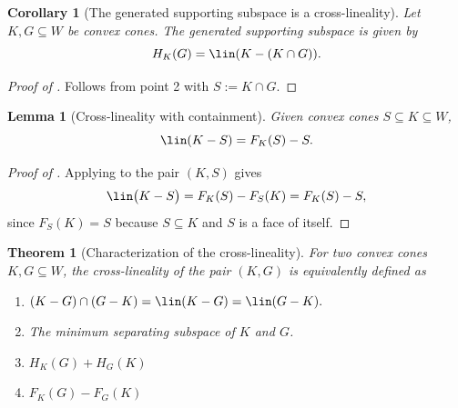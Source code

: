 \documentclass{article}
\theoremstyle{plain}
\newtheorem{theorem}{Theorem}[section]
\newtheorem{corollary}[corollary]{Corollary}
\newtheorem{lemma}[lemma]{Lemma}
\theoremstyle{definition}
\theoremstyle{remark}
\begin{document}
\begin{corollary}[The generated supporting subspace is a cross-lineality]
\label{loc:the_generated_supporting_subspace_is_a_cross:lineality.statement}
Let $K, G \subseteq W$ be convex cones. The generated supporting
subspace is given by 
\begin{equation*}
H_K(G)=  \lin(K- (K \cap G)).
\end{equation*}
\end{corollary}
\begin{proof}[\hypertarget{loc:the_generated_supporting_subspace_is_a_cross:lineality.proof}{}Proof of ]

Follows from  point 2 with $S := K \cap G$.
\end{proof}
\begin{lemma}[Cross-lineality with containment]
\label{loc:cross:lineality_with_containment.statement}
Given convex cones $S \subseteq K \subseteq W$,
\begin{equation*}
\lin(K - S) = F_K(S) - S.
\end{equation*}
\end{lemma}
\begin{proof}[\hypertarget{loc:cross:lineality_with_containment.proof}{}Proof of ]

Applying  to the pair $(K, S)$ gives
\begin{equation*}
\lin\bigl(K-S\bigr) = F_K(S) - F_{S}(K) = F_K(S) - S,
\end{equation*}
since $F_S(K) = S$ because $S \subseteq K$ and $S$ is a face of itself.
\end{proof}
\begin{theorem}[Characterization of the cross-lineality]
\label{loc:cross_lineality.statement}
For two convex cones $K, G \subseteq W$, the \emph{cross-lineality} of the pair $(K, G)$ is equivalently defined as
\begin{enumerate}
\item $(K-G) \cap (G -K)=\lin(K-G)=\lin(G-K).$
\item The minimum separating subspace of $K$ and $G$.
\item $H_K(G)+ H_G(K)$
\item $F_K(G) - F_G(K)$
\end{enumerate}
\end{theorem}
\end{document}
